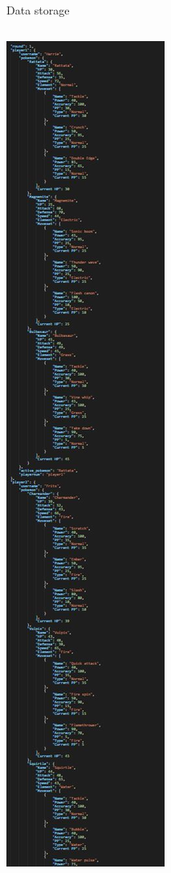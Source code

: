 \documentclass{beamer}
\begin{document}
\begin{frame}{Data storage}
\begin{columns}
			\includegraphics[scale=0.2]{Images/json.jpg}
	\end{columns}
\end{frame}

\end{document}
